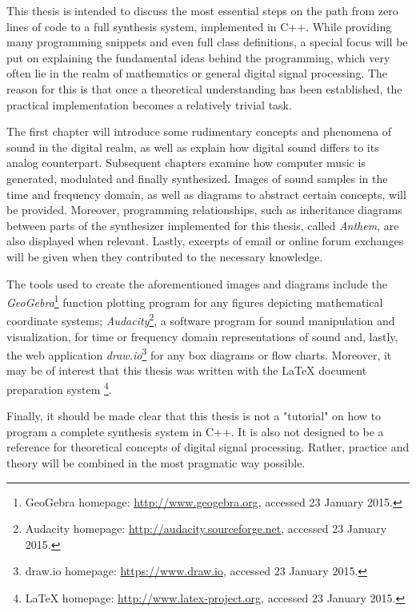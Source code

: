 \pagebreak

This thesis is intended to discuss the most essential steps on the path from zero lines of code to a full synthesis system, implemented in C++. While providing many programming snippets and even full class definitions\footnotemark{}, a special focus will be put on explaining the fundamental ideas behind the programming, which very often lie in the realm of mathematics or general digital signal processing. The reason for this is that once a theoretical understanding has been established, the practical implementation becomes a relatively trivial task.\parbreak


The first chapter will introduce some rudimentary concepts and phenomena of sound in the digital realm, as well as explain how digital sound differs to its analog counterpart. Subsequent chapters examine how computer music is generated, modulated and finally synthesized. Images of sound samples in the time and frequency domain, as well as diagrams to abstract certain concepts, will be provided. Moreover, programming relationships, such as inheritance diagrams between parts of the synthesizer implemented for this thesis, called \emph{Anthem}, are also displayed when relevant. Lastly, excerpts of email or online forum exchanges will be given when they contributed to the necessary knowledge. \parbreak

The tools used to create the aforementioned images and diagrams include the \emph{GeoGebra}\footnote{GeoGebra homepage: \url{http://www.geogebra.org}, accessed 23 January 2015.} function plotting program for any figures depicting mathematical coordinate systems; \emph{Audacity}\footnote{Audacity homepage: \url{http://audacity.sourceforge.net}, accessed 23 January 2015.}, a software program for sound manipulation and visualization, for time or frequency domain representations of sound and, lastly, the web application \emph{draw.io}\footnote{draw.io homepage: \url{https://www.draw.io}, accessed 23 January 2015.} for any box diagrams or flow charts. Moreover, it may be of interest that this thesis was written with the \LaTeX{} document preparation system \footnote{\LaTeX{} homepage: \url{http://www.latex-project.org}, accessed 23 January 2015.}. \parbreak

Finally, it should be made clear that this thesis is not a "tutorial" on how to program a complete synthesis system in C++. It is also not designed to be a reference for theoretical concepts of digital signal processing. Rather, practice and theory will be combined in the most pragmatic way possible.
